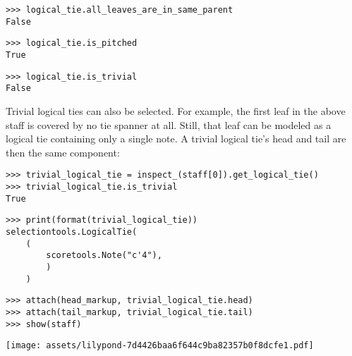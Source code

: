 \begin{abjadbookoutput}
\begin{singlespacing}
\vspace{-0.5\baselineskip}
\begin{verbatim}
>>> logical_tie.all_leaves_are_in_same_parent
False
\end{verbatim}
\begin{verbatim}
>>> logical_tie.is_pitched
True
\end{verbatim}
\begin{verbatim}
>>> logical_tie.is_trivial
False
\end{verbatim}
\end{singlespacing}
\end{abjadbookoutput}

\noindent Trivial logical ties can also be selected. For example, the first
leaf in the above staff is covered by no tie spanner at all. Still, that leaf
can be modeled as a logical tie containing only a single note. A trivial
logical tie's head and tail are then the same component:

\begin{comment}
<abjad>
trivial_logical_tie = inspect_(staff[0]).get_logical_tie()
trivial_logical_tie.is_trivial
print(format(trivial_logical_tie))
attach(head_markup, trivial_logical_tie.head)
attach(tail_markup, trivial_logical_tie.tail)
show(staff)
</abjad>
\end{comment}

\begin{abjadbookoutput}
\begin{singlespacing}
\vspace{-0.5\baselineskip}
\begin{verbatim}
>>> trivial_logical_tie = inspect_(staff[0]).get_logical_tie()
>>> trivial_logical_tie.is_trivial
True
\end{verbatim}
\begin{verbatim}
>>> print(format(trivial_logical_tie))
selectiontools.LogicalTie(
    (
        scoretools.Note("c'4"),
        )
    )
\end{verbatim}
\begin{verbatim}
>>> attach(head_markup, trivial_logical_tie.head)
>>> attach(tail_markup, trivial_logical_tie.tail)
>>> show(staff)
\end{verbatim}
\noindent\texttt{[image: assets/lilypond-7d4426baa6f644c9ba82357b0f8dcfe1.pdf]}
\end{singlespacing}
\end{abjadbookoutput}

